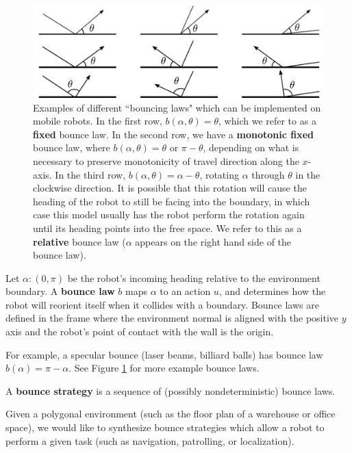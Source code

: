 \documentclass[]{styles/svproc}  %
\begin{document}
\begin{figure}
    \includegraphics[width=0.8\linewidth]{figures/bounce_examples.pdf}
    \centering
    \caption[test]{\label{fig:bex}Examples of different ``bouncing laws" which can be implemented on
mobile robots. In the first row, $b(\alpha, \theta) = \theta$, which we refer to
as a \textbf{fixed} bounce law. In the second row, we have a \textbf{monotonic
fixed} bounce law, where
$b(\alpha, \theta) = \theta$ or $\pi-\theta$, depending on what is necessary to
preserve monotonicity of travel direction along the $x$-axis. In the third
row, $b(\alpha, \theta) = \alpha - \theta$, rotating $\alpha$ through $\theta$ in the clockwise
direction. It is possible that this rotation will cause the 
heading of the robot to still be facing into the boundary, in which case this model usually has the robot 
perform the rotation again until its heading points into the free space. We
refer to this as a \textbf{relative} bounce law ($\alpha$ appears on the
right hand side of the bounce law).
}
\end{figure}

\begin{definition}
Let $\alpha: (0,\pi)$ be the robot's incoming heading relative to the
environment boundary. A \textbf{bounce law} $b$ maps $\alpha$ to an action
$u$, and determines how the robot will reorient itself when it collides with a
boundary. Bounce laws are defined in the
frame where the environment normal is aligned with the positive $y$ axis and the
robot's point of contact with the wall is the origin. 
\end{definition}

For example, a specular bounce (laser beams, billiard balls) has bounce law
$b(\alpha) = \pi - \alpha$. See Figure \ref{fig:bex} for more
example bounce laws. 

\begin{definition}
A \textbf{bounce strategy} is a sequence of (possibly nondeterministic) bounce
laws.
\end{definition}

Given a polygonal environment (such as the floor plan of a warehouse or office
space), we would like to synthesize bounce strategies which allow a robot to
perform a given task (such as navigation, patrolling, or localization).
\end{document}
